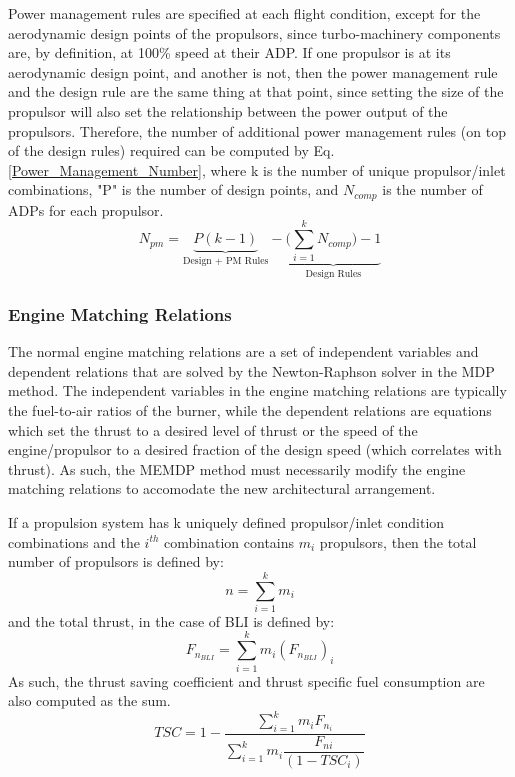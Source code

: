 			Power management rules are specified at each flight condition, except for the aerodynamic design points of the propulsors, since turbo-machinery components are, by definition, at 100\% speed at their ADP.  If one propulsor is at its aerodynamic design point, and another is not, then the power management rule and the design rule are the same thing at that point, since setting the size of the propulsor will also set the relationship between the power output of the propulsors.  Therefore, the number of additional power management rules (on top of the design rules) required can be computed by Eq. \ref{Power_Management_Number},	where k is the number of unique propulsor/inlet combinations, "P" is the number of design points, and $N_{comp}$ is the number of ADPs for each propulsor.
			\begin{equation}
				N_{pm} = \underbrace{P(k-1)}_\text{Design + PM Rules} - \underbrace{\Big(\sum\limits_{i=1}^{k} N_{comp}\Big) - 1}_\text{Design Rules}
				\label{Power_Management_Number}
			\end{equation}		
		
		\subsubsection{Engine Matching Relations}
			The normal engine matching relations are a set of independent variables and dependent relations that are solved by the Newton-Raphson solver in the MDP method.  The independent variables in the engine matching relations are typically the fuel-to-air ratios of the burner, while the dependent relations are equations which set the thrust to a desired level of thrust or the speed of the engine/propulsor to a desired fraction of the design speed (which correlates with thrust).  As such, the MEMDP method must necessarily modify the engine matching relations to accomodate the new architectural arrangement.  
			
			If a propulsion system has k uniquely defined propulsor/inlet condition combinations and the $i^{th}$ combination contains $m_i$ propulsors, then the total number of propulsors is defined by:			
			\begin{equation}
				n = \sum_{i=1}^{k}m_i 
			\end{equation}
			and the total thrust, in the case of BLI is defined by:
			\begin{equation}
				F_{n_{BLI}} = \sum_{i=1}^{k}m_i (F_{n_{BLI}})_i
			\end{equation}
			As such, the thrust saving coefficient and thrust specific fuel consumption are also computed as the sum.
			\begin{equation}
				TSC = 1 - \dfrac{\sum_{i=1}^{k}m_i F_{n_i}}{\sum_{i=1}^{k}m_i \dfrac{F_{ni}}{(1-TSC_i)}}
			\end{equation}
			
